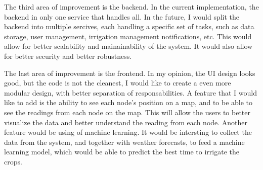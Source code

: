 The third area of improvement is the backend. In the current implementation, the backend in only
one service that handles all. In the future, I would split the backend into multiple sercives,
each handling a specific set of tasks, such as data storage, user management, irrigation management
notifications, etc. This would allow for better scalability and mainainability of the system. It would
also allow for better security and better robustness.

The last area of improvement is the frontend. In my opinion, the UI design looks good, but the code 
is not the cleanest, I would like to create a even more modular design, with better separation of responsabilities.
A feature that I would like to add is the ability to see each node's position on a map,
and to be able to see the readings from each node on the map. This will allow the users
to better visualize the data and better understand the reading from each node. 
Another feature would be using of machine learning. It would be intersting to collect the data from the system,
and together with weather forecasts, to feed a machine learning model, 
which would be able to predict the best time to irrigate the crops.
